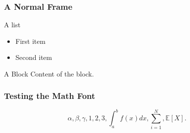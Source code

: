 \documentclass{beamer}
\begin{document}

\begin{frame} \frametitle{A Normal Frame}
A list
\begin{itemize}
\item First item
\item Second item
\end{itemize}

\begin{block}{A Block}
Content of the block.
\end{block}
\end{frame}

\begin{frame} \frametitle{Testing the Math Font}
\begin{equation*}
\alpha, \beta, \gamma, 1, 2, 3, \int_a^b f(x)dx, \sum_{i=1}^N, \mathbb{E}[X].
\end{equation*}
\end{frame}
\end{document}
